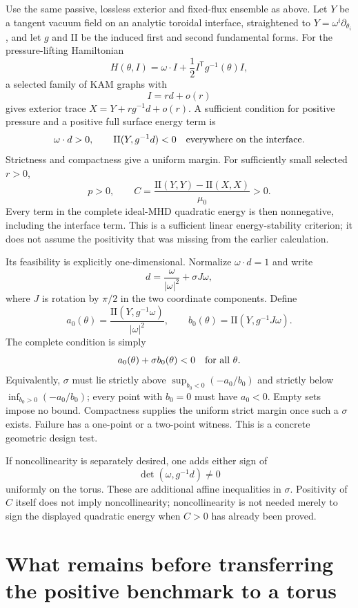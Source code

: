 Use the same passive, lossless exterior and fixed-flux ensemble as above.
Let $Y$ be a tangent vacuum field on an analytic toroidal interface,
straightened to $Y=\omega^i\partial_{\theta_i}$, and let $g$ and
$\mathrm{II}$ be the induced first and second fundamental forms.
For the pressure-lifting Hamiltonian
\[
 H(\theta,I)=\omega\cdot I+\frac12 I^{\mathsf T}g^{-1}(\theta)I,
\]
a selected family of KAM graphs with
\[
 I=r d+o(r)
\]
gives exterior trace $X=Y+r g^{-1}d+o(r)$.  A sufficient condition for
positive pressure and a positive full surface energy term is
\[
 \omega\cdot d>0,
 \qquad \mathrm{II}(Y,g^{-1}d)<0\quad\hbox{everywhere on the interface}.
\]
Strictness and compactness give a uniform margin.  For sufficiently
small selected $r>0$,
\[
 p>0,\qquad
 C=\frac{\mathrm{II}(Y,Y)-\mathrm{II}(X,X)}{\mu_0}>0.
\]
Every term in the complete ideal-MHD quadratic energy is then
nonnegative, including the interface term.  This is a sufficient
linear energy-stability criterion; it does not assume the positivity
that was missing from the earlier calculation.

Its feasibility is explicitly one-dimensional.  Normalize
$\omega\cdot d=1$ and write
\[
 d=\frac{\omega}{|\omega|^2}+\sigma J\omega,
\]
where $J$ is rotation by $\pi/2$ in the two coordinate components.
Define
\[
 a_0(\theta)=\frac{\mathrm{II}(Y,g^{-1}\omega)}{|\omega|^2},
 \qquad b_0(\theta)=\mathrm{II}(Y,g^{-1}J\omega).
\]
The complete condition is simply
\[
 a_0(\theta)+\sigma b_0(\theta)<0\quad\hbox{for all }\theta.
\]
Equivalently, $\sigma$ must lie strictly above
$\sup_{b_0<0}(-a_0/b_0)$ and strictly below
$\inf_{b_0>0}(-a_0/b_0)$; every point with $b_0=0$ must have $a_0<0$.
Empty sets impose no bound.  Compactness supplies the uniform strict
margin once such a $\sigma$ exists.  Failure has a one-point or a
two-point witness.  This is a concrete geometric design test.

If noncollinearity is separately desired, one adds either sign of
\[
 \det(\omega,g^{-1}d)\ne0
\]
uniformly on the torus.  These are additional affine inequalities in
$\sigma$.  Positivity of $C$ itself does not imply noncollinearity;
noncollinearity is not needed merely to sign the displayed quadratic
energy when $C>0$ has already been proved.

\section{What remains before transferring the positive benchmark to a torus}

